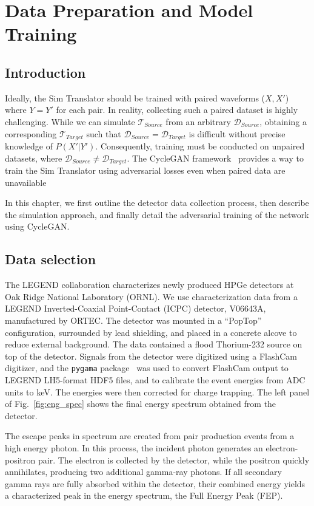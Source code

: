 \chapter{Data Preparation and Model Training}
\label{chap:training}
\section{Introduction}
Ideally, the Sim Translator should be trained with paired waveforms ($X, X'$) where $Y=Y'$ for each pair. In reality, collecting such a paired dataset is highly challenging. While we can simulate $\mathcal{T}_{Source}$ from an arbitrary $\mathcal{D}_{Source}$, obtaining a corresponding $\mathcal{T}_{Target}$ such that $\mathcal{D}_{Source} = \mathcal{D}_{Target}$ is difficult without precise knowledge of $P(X'|Y')$. Consequently, training must be conducted on unpaired datasets, where $\mathcal{D}_{Source} \neq \mathcal{D}_{Target}$. The CycleGAN framework~\cite{CycleGAN} provides a way to train the Sim Translator using adversarial losses even when paired data are unavailable

In this chapter, we first outline the detector data collection process, then describe the simulation approach, and finally detail the adversarial training of the network using CycleGAN.

\section{Data selection}

The LEGEND collaboration characterizes newly produced HPGe detectors at Oak Ridge National Laboratory (ORNL). We use characterization data from a LEGEND Inverted-Coaxial Point-Contact (ICPC) detector, V06643A, manufactured by ORTEC. The detector was mounted in a “PopTop” configuration, surrounded by lead shielding, and placed in a concrete alcove to reduce external background. The data contained a flood Thorium-232 source on top of the detector. Signals from the detector were digitized using a FlashCam digitizer, and the \texttt{pygama} package~\cite{pygama} was used to convert FlashCam output to LEGEND LH5-format HDF5 files, and to calibrate the event energies from ADC units to keV. The energies were then corrected for charge trapping. The left panel of Fig.~\ref{fig:eng_spec} shows the final energy spectrum obtained from the detector.


The escape peaks in spectrum are created from pair production events from a high energy photon. In this process, the incident photon generates an electron-positron pair. The electron is collected by the detector, while the positron quickly annihilates, producing two additional gamma-ray photons. If all secondary gamma rays are fully absorbed within the detector, their combined energy yields a characterized peak in the energy spectrum, the Full Energy Peak (FEP).


